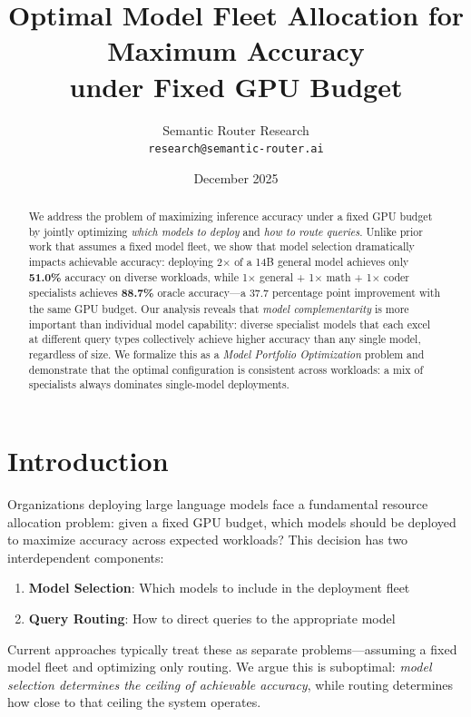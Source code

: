\documentclass[11pt,a4paper]{article}
\title{Optimal Model Fleet Allocation for Maximum Accuracy\\under Fixed GPU Budget}
\author{
  Semantic Router Research \\
  \texttt{research@semantic-router.ai}
}
\date{December 2025}
\begin{document}
\maketitle

\begin{abstract}
We address the problem of maximizing inference accuracy under a fixed GPU budget by jointly optimizing \emph{which models to deploy} and \emph{how to route queries}. Unlike prior work that assumes a fixed model fleet, we show that model selection dramatically impacts achievable accuracy: deploying 2$\times$ of a 14B general model achieves only \textbf{51.0\%} accuracy on diverse workloads, while 1$\times$ general + 1$\times$ math + 1$\times$ coder specialists achieves \textbf{88.7\%} oracle accuracy---a 37.7 percentage point improvement with the same GPU budget. Our analysis reveals that \emph{model complementarity} is more important than individual model capability: diverse specialist models that each excel at different query types collectively achieve higher accuracy than any single model, regardless of size. We formalize this as a \emph{Model Portfolio Optimization} problem and demonstrate that the optimal configuration is consistent across workloads: a mix of specialists always dominates single-model deployments.
\end{abstract}

\section{Introduction}

Organizations deploying large language models face a fundamental resource allocation problem: given a fixed GPU budget, which models should be deployed to maximize accuracy across expected workloads? This decision has two interdependent components:

\begin{enumerate}
    \item \textbf{Model Selection}: Which models to include in the deployment fleet
    \item \textbf{Query Routing}: How to direct queries to the appropriate model
\end{enumerate}

Current approaches typically treat these as separate problems---assuming a fixed model fleet and optimizing only routing. We argue this is suboptimal: \emph{model selection determines the ceiling of achievable accuracy}, while routing determines how close to that ceiling the system operates.
\end{document}

